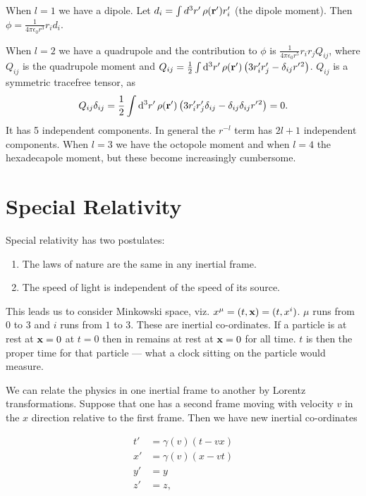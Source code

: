 \documentclass{notes}
\newcommand{\rv}{\vect{r}}
\begin{document}
When $l=1$ we have a dipole.  Let $d_i = \int d^3 r'\, \rho(\rv') r'_i$
(the dipole moment).  Then $\phi = \frac{1}{4 \pi \epsilon_0 r^3} r_i d_i$.

When $l=2$ we have a quadrupole and the contribution to $\phi$ is
$\frac{1}{4 \pi \epsilon_0 r^5} r_i r_j Q_{ij}$, where $Q_{ij}$ is
the quadrupole moment and $Q_{ij} = \frac{1}{2} \int \ud^3 r'\, \rho(\rv')
\left( 3 r'_i r'_j - \delta_{ij} r'{}^2 \right)$.  $Q_{ij}$ is a
symmetric tracefree tensor, as
\[
Q_{ij} \delta_{ij} = \frac{1}{2} \int \ud^3 r'\, \rho(\rv')
\left( 3 r'_i r'_j \delta_{ij} - \delta_{ij} \delta_{ij} r'{}^2 \right) = 0.
\]
It has 5 independent components.  In general the $r^{-l}$ term has
$2 l + 1$ independent components.  When $l=3$ we have the octopole moment
and when $l=4$ the hexadecapole moment, but these become increasingly
cumbersome.

\section{Special Relativity}

Special relativity has two postulates:

\begin{enumerate}
\item The laws of nature are the same in any inertial frame.
\item The speed of light is independent of the speed of its source.
\end{enumerate}

This leads us to consider Minkowski space, viz.
$x^\mu = (t,\mathbf{x}) = (t,x^i)$.  $\mu$ runs from $0$ to $3$ and $i$ runs from
$1$ to $3$.  These are inertial co-ordinates.  If a particle is at rest
at $\mathbf{x} = 0$ at $t=0$ then in remains at rest at $\mathbf{x} = 0$ for all time.
$t$ is then the proper time for that particle --- what a clock sitting on
the particle would measure.

We can relate the physics in one inertial frame to another by Lorentz
transformations.  Suppose that one has a second frame moving with
velocity $v$ in the $x$ direction relative to the first frame.  Then
we have new inertial co-ordinates

\begin{align*}
t' &= \gamma(v) (t - v x) \\
x' &= \gamma(v) (x - v t) \\
y' &= y \\
z' &= z,
\end{align*}
\end{document}
